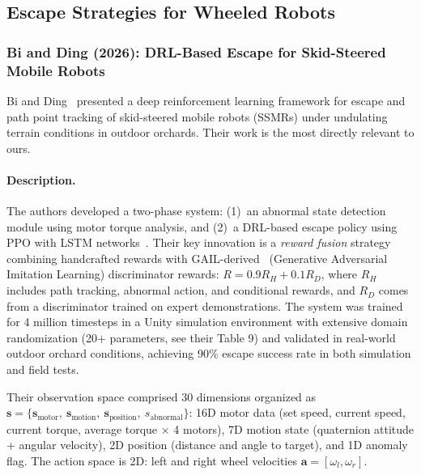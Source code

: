 \documentclass[12pt,a4paper]{article}
\begin{document}
\subsection{Escape Strategies for Wheeled Robots}

\subsubsection{Bi and Ding (2026): DRL-Based Escape for Skid-Steered Mobile Robots}

Bi and Ding~\cite{bi2026escape} presented a deep reinforcement learning framework for escape and path point tracking of skid-steered mobile robots (SSMRs) under undulating terrain conditions in outdoor orchards. Their work is the most directly relevant to ours.

\paragraph{Description.} The authors developed a two-phase system: (1)~an abnormal state detection module using motor torque analysis, and (2)~a DRL-based escape policy using PPO with LSTM networks~\cite{hochreiter1997lstm}. Their key innovation is a \textit{reward fusion} strategy combining handcrafted rewards with GAIL-derived~\cite{ho2016gail} (Generative Adversarial Imitation Learning) discriminator rewards: $R = 0.9 R_H + 0.1 R_D$, where $R_H$ includes path tracking, abnormal action, and conditional rewards, and $R_D$ comes from a discriminator trained on expert demonstrations. The system was trained for 4 million timesteps in a Unity simulation environment with extensive domain randomization (20+ parameters, see their Table 9) and validated in real-world outdoor orchard conditions, achieving 90\% escape success rate in both simulation and field tests.

Their observation space comprised 30 dimensions organized as $\mathbf{s} = \{\mathbf{s}_{\text{motor}},\allowbreak\ \mathbf{s}_{\text{motion}},\allowbreak\ \mathbf{s}_{\text{position}},\allowbreak\ s_{\text{abnormal}}\}$: 16D motor data (set speed, current speed, current torque, average torque $\times$ 4 motors), 7D motion state (quaternion attitude + angular velocity), 2D position (distance and angle to target), and 1D anomaly flag. The action space is 2D: left and right wheel velocities $\mathbf{a} = [\omega_l, \omega_r]$.
\end{document}
